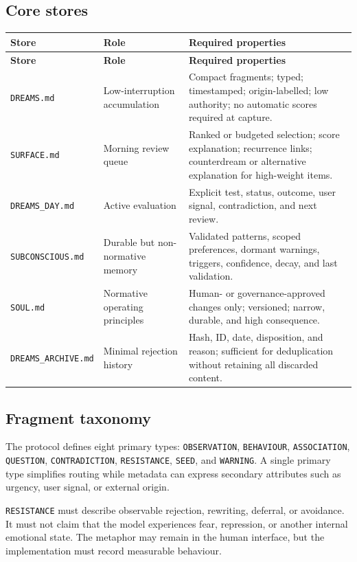 \documentclass[11pt,a4paper]{article}
\begin{document}
\subsection{Core stores}

{\small
\begin{longtable}{L{0.23\textwidth}L{0.24\textwidth}L{0.45\textwidth}}
\toprule
\textbf{Store} & \textbf{Role} & \textbf{Required properties} \\
\midrule
\endfirsthead
\toprule
\textbf{Store} & \textbf{Role} & \textbf{Required properties} \\
\midrule
\endhead
\texttt{DREAMS.md} & Low-interruption accumulation & Compact fragments; typed; timestamped; origin-labelled; low authority; no automatic scores required at capture. \\
\texttt{SURFACE.md} & Morning review queue & Ranked or budgeted selection; score explanation; recurrence links; counterdream or alternative explanation for high-weight items. \\
\texttt{DREAMS\_DAY.md} & Active evaluation & Explicit test, status, outcome, user signal, contradiction, and next review. \\
\texttt{SUBCONSCIOUS.md} & Durable but non-normative memory & Validated patterns, scoped preferences, dormant warnings, triggers, confidence, decay, and last validation. \\
\texttt{SOUL.md} & Normative operating principles & Human- or governance-approved changes only; versioned; narrow, durable, and high consequence. \\
\texttt{DREAMS\_ARCHIVE.md} & Minimal rejection history & Hash, ID, date, disposition, and reason; sufficient for deduplication without retaining all discarded content. \\
\bottomrule
\end{longtable}
}

\subsection{Fragment taxonomy}

The protocol defines eight primary types: \texttt{OBSERVATION}, \texttt{BEHAVIOUR}, \texttt{ASSOCIATION}, \texttt{QUESTION}, \texttt{CONTRADICTION}, \texttt{RESISTANCE}, \texttt{SEED}, and \texttt{WARNING}. A single primary type simplifies routing while metadata can express secondary attributes such as urgency, user signal, or external origin.

\begin{keybox}
\texttt{RESISTANCE} must describe observable rejection, rewriting, deferral, or avoidance. It must not claim that the model experiences fear, repression, or another internal emotional state. The metaphor may remain in the human interface, but the implementation must record measurable behaviour.
\end{keybox}
\end{document}
